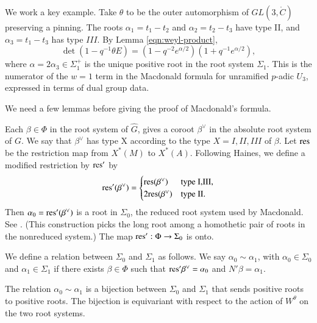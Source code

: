 We work a key example.  
Take $\theta$ to be the outer automorphism of $GL(3,\ring{C})$ preserving a pinning.  
The roots $\alpha_1 = t_1-t_2$ and $\alpha_2 = t_2-t_3$ have type II,
and $\alpha_3=t_1-t_3$ has type $III$.  By Lemma \ref{eqn:weyl-product},
\[
\det(1- q^{-1} \theta E) = (1- q^{-2} e^{\alpha/2}) (1 + q^{-1} e^{\alpha/2}),
\]
where $\alpha=2\alpha_3\in \Sigma_1^+$ is the unique positive root in the root system $\Sigma_1$.
This is  the numerator of the $w=1$ term 
in the Macdonald formula for unramified $p$-adic $U_3$, expressed in terms of dual group data.



We need a few lemmas before giving the proof of Macdonald's
formula.

Each $\beta\in \Phi$ in the root system of $\hat G$, gives a
 coroot $\beta^\vee$ in the absolute root system of $G$.  We say that $\beta^\vee$ has type X according to
the type $X=I,II,III$ of $\beta$.
Let ${\operatorname{res}}$ be the restriction map from $X^*(M)$ to $X^*(A)$.
Following Haines, we define a modified restriction by ${\operatorname{res}}'$ by
\[
{\operatorname{res}}' (\beta^\vee) = \begin{cases}
{\operatorname{res}}(\beta^\vee) & \text{type I,III},\\
2{\operatorname{res}}(\beta^\vee) & \text{type II}.
\end{cases}
\]
Then $\alpha_0={\operatorname{res}}'(\beta^\vee)$ is a root in $\Sigma_0$, the reduced root system used by Macdonald.  See \cite[Th.B]{haines2016dualities}.
(This construction picks the long root among a homothetic pair
of roots in the nonreduced system.)
The map ${\operatorname{res}}':\Phi\to \Sigma_0$ is onto.

We define a relation between $\Sigma_0$ and $\Sigma_1$ as follows.
We say $\alpha_0\sim\alpha_1$, with $\alpha_0\in\Sigma_0$ and
$\alpha_1\in \Sigma_1$ if there exists $\beta\in \Phi$ such
that ${\operatorname{res}}'\beta^\vee = \alpha_0$ and $N'\beta = \alpha_1$.

\begin{lemma}  The relation $\alpha_0\sim\alpha_1$ is a bijection
between $\Sigma_0$ and $\Sigma_1$ that sends positive roots to positive roots.
The bijection is equivariant with respect to the action of $W^\theta$ on the two root
systems.
\end{lemma}

